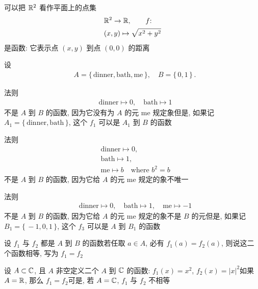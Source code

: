 \begin{example}
    可以把 $\mathbb{R}^2$ 看作平面上的点集\period
    \begin{align*}
         & \mathbb{R}^2 \to \mathbb{R},  \tag*{$f$:}  \\
         & (x,y) \mapsto \sqrt{x^2+y^2}
    \end{align*}
    是函数: 它表示点 $(x,y)$ 到点 $(0,0)$ 的距离\period
\end{example}

\begin{example}
    设
    \begin{align*}
         & A = \{\, \text{dinner}, \text{bath}, \text{me} \,\}, \quad B = \{\, 0,1 \,\} \period
    \end{align*}

    法则
    \begin{align*}
         & \text{dinner} \mapsto 0, \quad \text{bath} \mapsto 1 \tag*{$f_1$:}
    \end{align*}
    不是 $A$ 到 $B$ 的函数, 因为它没有为 $A$ 的元 $\text{me}$ 规定象\period 但是, 如果记 $A_1 = \{\, \text{dinner}, \text{bath} \,\}$, 这个 $f_1$ 可以是 $A_1$ 到 $B$ 的函数\period

    法则
    \begin{align*}
         & \text{dinner} \mapsto 0, \tag*{$f_2$:}          \\
         & \text{bath} \mapsto 1,                          \\
         & \text{me} \mapsto b \quad \text{where } b^2 = b
    \end{align*}
    不是 $A$ 到 $B$ 的函数, 因为它给 $A$ 的元 $\text{me}$ 规定的象不唯一\period

    法则
    \begin{align*}
         & \text{dinner} \mapsto 0, \quad
        \text{bath} \mapsto 1, \quad
        \text{me} \mapsto -1 \tag*{$f_3$:}
    \end{align*}
    不是 $A$ 到 $B$ 的函数, 因为它给 $A$ 的元 $\text{me}$ 规定的象不是 $B$ 的元\period 但是, 如果记 $B_1 = \{\, -1,0,1 \,\}$, 这个 $f_3$ 可以是 $A$ 到 $B_1$ 的函数\period
\end{example}

\begin{definition}
    设 $f_1$ 与 $f_2$ 都是 $A$ 到 $B$ 的函数\period 若任取 $a \in A$, 必有 $f_1 (a) = f_2 (a)$, 则说这二个函数相等, 写为 $f_1 = f_2$\period
\end{definition}

\begin{example}
    设 $A \subset \mathbb{C}$, 且 $A$ 非空\period 定义二个 $A$ 到 $\mathbb{C}$ 的函数: $f_1 (x) = x^2$, $f_2 (x) = |x|^2$\period 如果 $A = \mathbb{R}$, 那么 $f_1 = f_2$\period 可是, 若 $A = \mathbb{C}$, $f_1$ 与 $f_2$ 不相等\period
\end{example}

